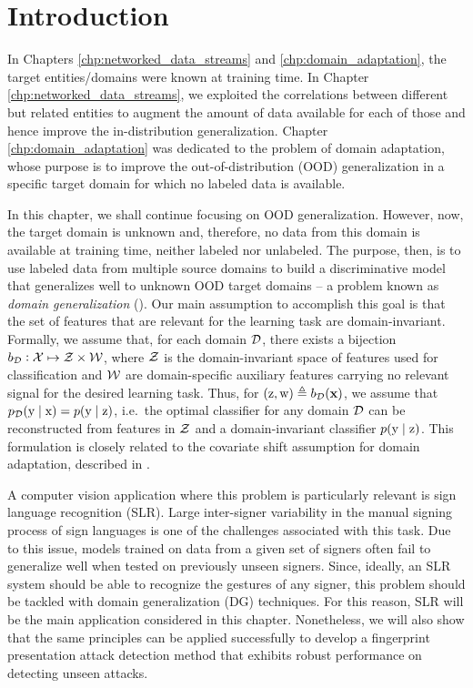 \section{Introduction}
\label{sec:chp4_intro}
In Chapters \ref{chp:networked_data_streams} and \ref{chp:domain_adaptation}, the target entities/domains were known at training time. In Chapter \ref{chp:networked_data_streams}, we exploited the correlations between different but related entities to augment the amount of data available for each of those and hence improve the in-distribution generalization. Chapter \ref{chp:domain_adaptation} was dedicated to the problem of domain adaptation, whose purpose is to improve the out-of-distribution (OOD) generalization in a specific target domain for which no labeled data is available.

In this chapter, we shall continue focusing on OOD generalization. However, now, the target domain is unknown and, therefore, no data from this domain is available at training time, neither labeled nor unlabeled. The purpose, then, is to use labeled data from multiple source domains to build a discriminative model that generalizes well to unknown OOD target domains -- a problem known as \emph{domain generalization} (\citet{Blanchard2011, Muandet2013}). Our main assumption to accomplish this goal is that the set of features that are relevant for the learning task are domain-invariant. Formally, we assume that, for each domain ${\mathcal{D}}$, there exists a bijection $b_{\mathcal{D}}: {\mathcal{X}} \mapsto {\mathcal{Z}} \times {\mathcal{W}}$, where ${\mathcal{Z}}$ is the domain-invariant space of features used for classification and ${\mathcal{W}}$ are domain-specific auxiliary features carrying no relevant signal for the desired learning task. Thus, for $({\textnormal{z}}, {\textnormal{w}}) \triangleq b_{\mathcal{D}}({\mathbf{x}})$, we assume that $p_{\mathcal{D}}({\textnormal{y}} \mid {\textnormal{x}}) = p({\textnormal{y}} \mid {\textnormal{z}})$, i.e.\ the optimal classifier for any domain ${\mathcal{D}}$ can be reconstructed from features in ${\mathcal{Z}}$ and a domain-invariant classifier $p({\textnormal{y}} \mid {\textnormal{z}})$.  This formulation is closely related to the covariate shift assumption for domain adaptation, described in .

A computer vision application where this problem is particularly relevant is sign language recognition (SLR). Large inter-signer variability in the manual signing process of sign languages is one of the challenges associated with this task. Due to this issue, models trained on data from a given set of signers often fail to generalize well when tested on previously unseen signers. Since, ideally, an SLR system should be able to recognize the gestures of any signer, this problem should be tackled with domain generalization (DG) techniques. For this reason, SLR will be the main application considered in this chapter. Nonetheless, we will also show that the same principles can be applied successfully to develop a fingerprint presentation attack detection method that exhibits robust performance on detecting unseen attacks.

